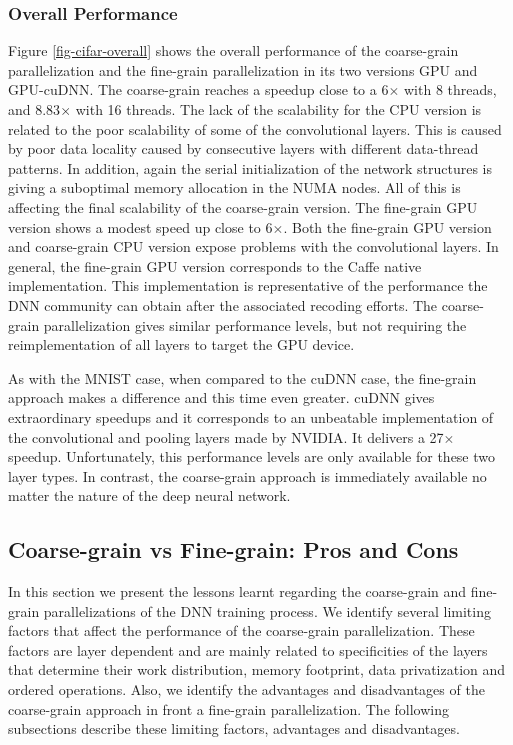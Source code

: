 \subsubsection{Overall Performance}
Figure \ref{fig-cifar-overall} shows the overall performance of
the coarse-grain parallelization and the fine-grain parallelization in
its two versions GPU and GPU-cuDNN. The coarse-grain reaches a speedup
close to a 6$\times$ with 8 threads, and 8.83$\times$ with 16 threads. The lack of
the scalability for the CPU version is related to the poor scalability
of some of the convolutional layers. This is caused by poor data locality caused by consecutive layers with different data-thread patterns. 
In addition, again the serial initialization of
the network structures is giving a suboptimal memory allocation in
the NUMA nodes. All of this is affecting the final scalability of
the coarse-grain version. The fine-grain GPU version shows a
modest speed up close to 6$\times$. Both the fine-grain GPU version and 
coarse-grain CPU version expose problems with the convolutional layers.
In general, the fine-grain GPU version corresponds to the Caffe native 
implementation. This implementation is representative of the 
performance the DNN community can obtain after the associated recoding 
efforts. The coarse-grain parallelization gives similar performance levels, but not requiring the reimplementation of all layers to target the GPU device. 

As with the MNIST case, when compared to the cuDNN case, the fine-grain 
approach makes a difference and this time even greater. cuDNN gives 
extraordinary speedups and it corresponds to an unbeatable implementation 
of the convolutional and pooling layers made by NVIDIA. It delivers a 
27$\times$ speedup. Unfortunately, this performance levels are only available 
for these two layer types. In contrast, the coarse-grain approach is 
immediately available no matter the nature of the deep neural network.

\subsection{Coarse-grain vs Fine-grain: Pros and Cons}
In this section we present the lessons learnt regarding the coarse-grain 
and fine-grain parallelizations of the DNN training process. We identify 
several limiting factors that affect the performance of the 
coarse-grain parallelization. These factors are layer dependent and are 
mainly related to specificities of the layers that determine their 
work distribution, memory footprint, data privatization and ordered 
operations. Also, we identify the advantages and disadvantages of 
the coarse-grain approach in front a fine-grain parallelization. 
The following subsections describe these limiting factors, 
advantages and disadvantages.

